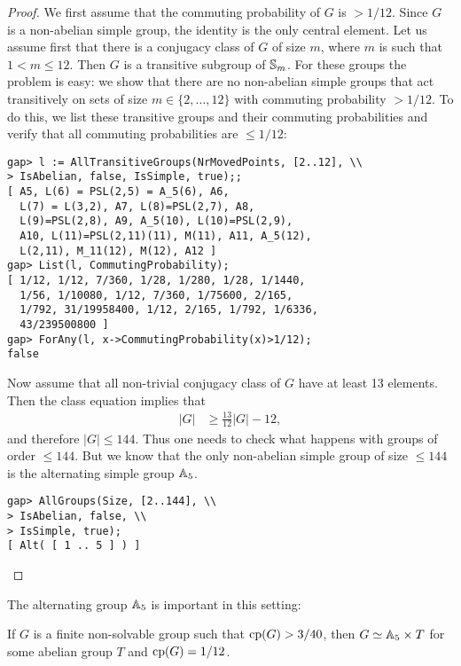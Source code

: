 \begin{proof}
We first assume that the commuting probability of $G$ is $>1/12$. Since
$G$ is a non-abelian simple group, the identity is the only central element. 
Let us assume first that there is a conjugacy class of $G$ of size $m$, where
$m$ is such that $1<m\leq 12$. Then $G$ is a transitive subgroup of $\mathbb{S}_m$.
For these groups the problem is easy: we show that there are no non-abelian simple groups
that act transitively on sets of size $m\in\{2,\dots,12\}$ with commuting
probability $>1/12$. To do this, we list these transitive groups and their commuting
probabilities and verify that all commuting probabilities are $\leq
1/12$:
\begin{lstlisting}
gap> l := AllTransitiveGroups(NrMovedPoints, [2..12], \\
> IsAbelian, false, IsSimple, true);;
[ A5, L(6) = PSL(2,5) = A_5(6), A6, 
  L(7) = L(3,2), A7, L(8)=PSL(2,7), A8, 
  L(9)=PSL(2,8), A9, A_5(10), L(10)=PSL(2,9), 
  A10, L(11)=PSL(2,11)(11), M(11), A11, A_5(12), 
  L(2,11), M_11(12), M(12), A12 ]
gap> List(l, CommutingProbability);           
[ 1/12, 1/12, 7/360, 1/28, 1/280, 1/28, 1/1440, 
  1/56, 1/10080, 1/12, 7/360, 1/75600, 2/165, 
  1/792, 31/19958400, 1/12, 2/165, 1/792, 1/6336, 
  43/239500800 ]
gap> ForAny(l, x->CommutingProbability(x)>1/12);
false
\end{lstlisting}

Now assume that all non-trivial conjugacy class of $G$ have at least 13 elements. 
Then the class equation implies that
\begin{align*}
	|G|&\geq \frac{13}{12}|G|-12,
\end{align*}
and therefore $|G|\leq 144$. Thus one needs to check what happens with groups
of order $\leq 144$. 
But we know that the only non-abelian simple group of size
$\leq 144$ is the alternating simple group $\mathbb{A}_5$.
\begin{lstlisting}
gap> AllGroups(Size, [2..144], \\
> IsAbelian, false, \\
> IsSimple, true);
[ Alt( [ 1 .. 5 ] ) ]
\end{lstlisting}    
\end{proof}

The alternating group $\mathbb{A}_5$ is important in this setting:

\begin{theorem}
    If $G$ is a finite non-solvable group such that $\operatorname{cp}(G)>3/40$, then
    $G\simeq\mathbb{A}_5\times T$ for some abelian group 
    $T$ and $\operatorname{cp}(G)=1/12$. 
\end{theorem}

